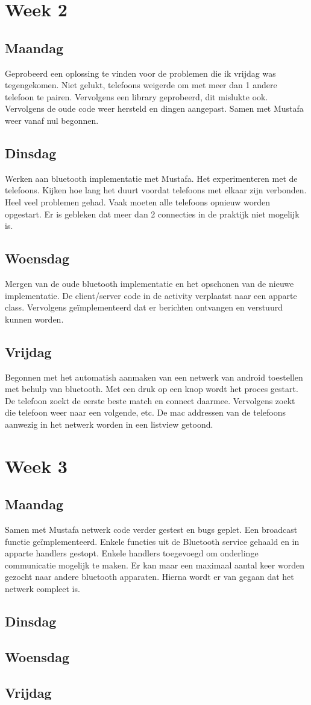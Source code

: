 \documentclass[12pt]{article}
\begin{document}
\section*{Week 2}
\subsection*{Maandag}
Geprobeerd een oplossing te vinden voor de problemen die ik vrijdag was tegengekomen. Niet gelukt, telefoons weigerde om met meer dan 1 andere telefoon te pairen. Vervolgens een library geprobeerd, dit mislukte ook. Vervolgens de oude code weer hersteld en dingen aangepast. Samen met Mustafa weer vanaf nul begonnen.

\subsection*{Dinsdag}
Werken aan bluetooth implementatie met Mustafa. Het experimenteren met de telefoons. Kijken hoe lang het duurt voordat telefoons met elkaar zijn verbonden. Heel veel problemen gehad. Vaak moeten alle telefoons opnieuw worden opgestart. Er is gebleken dat meer dan 2 connecties in de praktijk niet mogelijk is.

\subsection*{Woensdag}
Mergen van de oude bluetooth implementatie en het opschonen van de nieuwe implementatie. De client/server code in de activity verplaatst naar een apparte class. Vervolgens ge\"implementeerd dat er berichten ontvangen en verstuurd kunnen worden.

\subsection*{Vrijdag}
Begonnen met het automatish aanmaken van een netwerk van android toestellen met behulp van bluetooth. Met een druk op een knop wordt het proces gestart. De telefoon zoekt de eerste beste match en connect daarmee. Vervolgens zoekt die telefoon weer naar een volgende, etc. De mac addressen van de telefoons aanwezig in het netwerk worden in een listview getoond.

\section*{Week 3}
\subsection*{Maandag}
Samen met Mustafa netwerk code verder gestest en bugs geplet. Een broadcast functie ge\"implementeerd. Enkele functies uit de Bluetooth service gehaald en in apparte handlers gestopt. Enkele handlers toegevoegd om onderlinge communicatie mogelijk te maken. Er kan maar een maximaal aantal keer worden gezocht naar andere bluetooth apparaten. Hierna wordt er van gegaan dat het netwerk compleet is. 

\subsection*{Dinsdag}
\subsection*{Woensdag}
\subsection*{Vrijdag}
\end{document}

